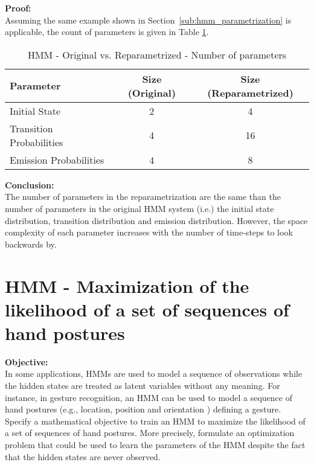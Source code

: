 \documentclass[parskip=half]{scrartcl}
\begin{document}
        \textbf{Proof:}\\
        Assuming the same example shown in Section~\ref{sub:hmm_parametrization} is applicable, the count of parameters is given in Table \ref{tab:hmm-original-vs-reparametrized}.
        \begin{table}[th]
            \centering
            \begin{tabular}{| l | c | c |}
            \hline
            \textbf{Parameter} & \textbf{Size (Original)} & \textbf{Size (Reparametrized)} \\
            \hline
            \hline
                Initial State & 2 & 4 \\
            \hline
                Transition Probabilities & 4 & 16 \\
            \hline
                Emission Probabilities & 4 & 8 \\
            \hline
            \end{tabular}
            \caption{HMM - Original vs. Reparametrized - Number of parameters}
            \label{tab:hmm-original-vs-reparametrized}
        \end{table}

        \textbf{Conclusion:}\\
        The number of parameters in the reparametrization are the same than the number of parameters in the original HMM system (i.e.) the initial state distribution, transition distribution and emission distribution. However, the space complexity of each parameter increases with the number of time-steps to look backwards by. 




\newpage


\section{HMM - Maximization of the likelihood of a set of sequences of hand postures} %
\label{sec:hmm_maximization_of_the_likelihood_of_a_set_of_sequences_of_hand_postures}

    \textbf{Objective:}\\
    In some applications, HMMs are used to model a sequence of observations while the hidden states are treated as latent variables without any meaning. For instance, in gesture recognition, an HMM can be used to model a sequence of hand postures (e.g., location, position and orientation ) defining a gesture. Specify a mathematical objective to train an HMM to maximize the likelihood of a set of sequences of hand postures. More precisely, formulate an optimization problem that could be used to learn the parameters of the HMM despite the fact that the hidden states are never observed. 
\end{document}
